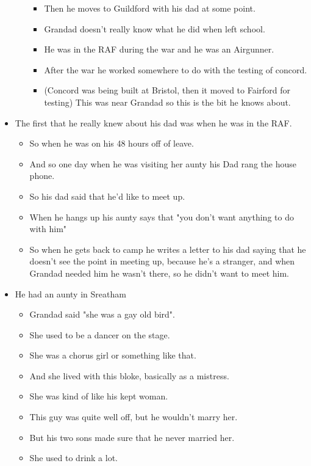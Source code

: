 \documentclass[10pt,twocolumn,letterpaper]{article}
\begin{document}
\begin{itemize}
\begin{itemize}
\begin{itemize}
            \item Then he moves to Guildford with his dad at some point.
            \item Grandad doesn't really know what he did when left school.
            \item He was in the RAF during the war and he was an Airgunner.
            \item After the war he worked somewhere to do with the testing of concord.
            \item (Concord was being built at Bristol, then it moved to Fairford for testing) This was near Grandad so this is the bit he knows about.
        \end{itemize}
    \end{itemize}
    \item The first that he really knew about his dad was when he was in the RAF.
    \begin{itemize}
        \item So when he was on his 48 hours off of leave.
        \item And so one day when he was visiting her aunty his Dad rang the house phone.
        \item So his dad said that he'd like to meet up.
        \item When he hangs up his aunty says that "you don't want anything to do with him"
        \item So when he gets back to camp he writes a letter to his dad saying that he doesn't see the point in meeting up, because he's a  stranger, and when Grandad needed him he wasn't there, so he didn't want to meet him.
    \end{itemize}
    \item He had an aunty in Sreatham
    \begin{itemize}
        \item Grandad said "she was a gay old bird".
        \item She used to be a dancer on the stage.
        \item She was a chorus girl or something like that.
        \item And she lived with this bloke, basically as a mistress.
        \item She was kind of like his kept woman.
        \item This guy was quite well off, but he wouldn't marry her.
        \item But his two sons made sure that he never married her.
        \item She used to drink a lot.

\end{itemize}
\end{itemize}
\end{document}
